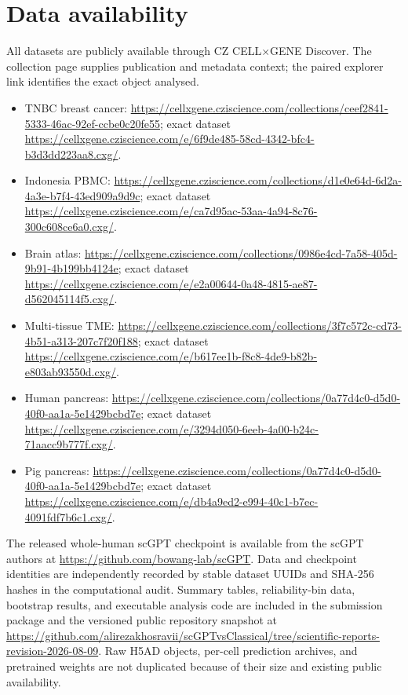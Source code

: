 \section{Data availability}

All datasets are publicly available through CZ CELL$\times$GENE Discover. The collection page supplies publication and metadata context; the paired explorer link identifies the exact object analysed.
\begin{itemize}
\item TNBC breast cancer: \url{https://cellxgene.cziscience.com/collections/ceef2841-5333-46ac-92ef-ccbe0c20fe55}; exact dataset \url{https://cellxgene.cziscience.com/e/6f9de485-58cd-4342-bfc4-b3d3dd223aa8.cxg/}.
\item Indonesia PBMC: \url{https://cellxgene.cziscience.com/collections/d1e0e64d-6d2a-4a3e-b7f4-43ed909a9d9c}; exact dataset \url{https://cellxgene.cziscience.com/e/ca7d95ac-53aa-4a94-8c76-300c608ce6a0.cxg/}.
\item Brain atlas: \url{https://cellxgene.cziscience.com/collections/0986e4cd-7a58-405d-9b91-4b199bb4124e}; exact dataset \url{https://cellxgene.cziscience.com/e/e2a00644-0a48-4815-ae87-d562045114f5.cxg/}.
\item Multi-tissue TME: \url{https://cellxgene.cziscience.com/collections/3f7c572c-cd73-4b51-a313-207c7f20f188}; exact dataset \url{https://cellxgene.cziscience.com/e/b617ee1b-f8c8-4de9-b82b-e803ab93550d.cxg/}.
\item Human pancreas: \url{https://cellxgene.cziscience.com/collections/0a77d4c0-d5d0-40f0-aa1a-5e1429bcbd7e}; exact dataset \url{https://cellxgene.cziscience.com/e/3294d050-6eeb-4a00-b24c-71aacc9b777f.cxg/}.
\item Pig pancreas: \url{https://cellxgene.cziscience.com/collections/0a77d4c0-d5d0-40f0-aa1a-5e1429bcbd7e}; exact dataset \url{https://cellxgene.cziscience.com/e/db4a9ed2-e994-40c1-b7ec-4091fdf7b6c1.cxg/}.
\end{itemize}

The released whole-human scGPT checkpoint is available from the scGPT authors at \url{https://github.com/bowang-lab/scGPT}. Data and checkpoint identities are independently recorded by stable dataset UUIDs and SHA-256 hashes in the computational audit. Summary tables, reliability-bin data, bootstrap results, and executable analysis code are included in the submission package and the versioned public repository snapshot at \url{https://github.com/alirezakhosravii/scGPTvsClassical/tree/scientific-reports-revision-2026-08-09}. Raw H5AD objects, per-cell prediction archives, and pretrained weights are not duplicated because of their size and existing public availability.
